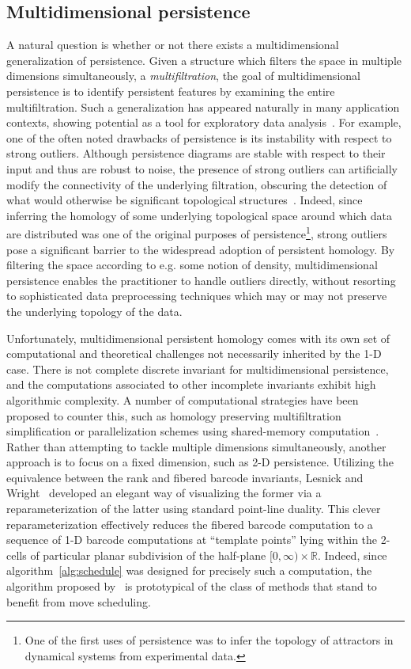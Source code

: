 \documentclass{siamart190516}
\begin{document}
\subsection*{Multidimensional persistence}
A natural question is whether or not there exists a multidimensional generalization of persistence. Given a structure which filters the space in multiple dimensions simultaneously, a \emph{multifiltration}, the goal of multidimensional persistence is to identify persistent features by examining the entire multifiltration. Such a generalization has appeared naturally in many application contexts, showing potential as a tool for exploratory data analysis~\cite{lesnick2012multidimensional}. 
For example, one of the often noted drawbacks of persistence is its instability with respect to strong outliers. Although persistence diagrams are stable with respect to their input and thus are robust to noise, the presence of strong outliers can artificially modify the connectivity of the underlying filtration, obscuring the detection of what would otherwise be significant topological structures~\cite{buchet2015topological}. Indeed, since inferring the homology of some underlying topological space around which data are distributed was one of the original purposes of persistence\footnote{One of the first uses of persistence was to infer the topology of attractors in dynamical systems from experimental data\cite{perea2018brief}.}, strong outliers pose a significant barrier to the widespread adoption of persistent homology. By filtering the space according to e.g. some notion of density, multidimensional persistence enables the practitioner to handle outliers directly, without resorting to sophisticated data preprocessing techniques which may or may not preserve the underlying topology of the data. 

Unfortunately, multidimensional persistent homology comes with its own set of computational and theoretical challenges not necessarily inherited by the 1-D case. There is not complete discrete invariant for multidimensional persistence, and the computations associated to other incomplete invariants exhibit high algorithmic complexity. A number of computational strategies have been proposed to counter this, such as homology preserving multifiltration simplification or parallelization schemes using shared-memory computation~\cite{fugacci2019chunk}. Rather than attempting to tackle multiple dimensions simultaneously, another approach is to focus on a fixed dimension, such as 2-D persistence. Utilizing the equivalence between the rank and fibered barcode invariants, Lesnick and Wright~\cite{lesnick2015interactive} developed an elegant way of visualizing the former via a reparameterization of the latter using standard point-line duality. This clever reparameterization effectively reduces the fibered barcode computation to a sequence of 1-D barcode computations at ``template points'' lying within the 2-cells of particular planar subdivision of the half-plane $[0, \infty) \times \mathbb{R}$. Indeed, since algorithm~\ref{alg:schedule} was designed for precisely such a computation, the algorithm proposed by~\cite{lesnick2015interactive} is prototypical of the class of methods that stand to benefit from move scheduling. 
\end{document}
